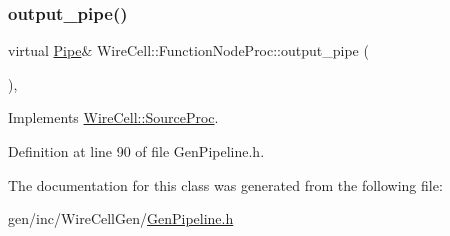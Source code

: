 \subsubsection{\texorpdfstring{output\+\_\+pipe()}{output\_pipe()}}
{\footnotesize\ttfamily virtual \hyperlink{namespace_wire_cell_afce9bb01c731347c3d4c8ca9d4ed804f}{Pipe}\& Wire\+Cell\+::\+Function\+Node\+Proc\+::output\+\_\+pipe (\begin{DoxyParamCaption}{ }\end{DoxyParamCaption})\hspace{0.3cm}{\ttfamily [inline]}, {\ttfamily [virtual]}}



Implements \hyperlink{class_wire_cell_1_1_source_proc_a480b8ba5e80e9e7c6ffdf0b5d9fd0578}{Wire\+Cell\+::\+Source\+Proc}.



Definition at line 90 of file Gen\+Pipeline.\+h.



The documentation for this class was generated from the following file\+:\begin{DoxyCompactItemize}
\item 
gen/inc/\+Wire\+Cell\+Gen/\hyperlink{_gen_pipeline_8h}{Gen\+Pipeline.\+h}\end{DoxyCompactItemize}
